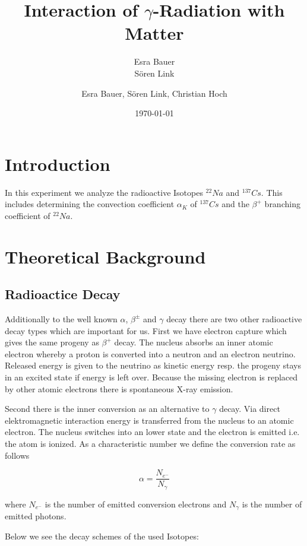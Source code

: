 \documentclass[bigchapter,colorback,accentcolor=tud4b,linedtoc,11pt]{tudreport}
\title{Interaction of $\gamma$-Radiation with Matter}
\subtitle{Esra Bauer  \\Sören Link}
\author{Esra Bauer, Sören Link, Christian Hoch}
\date{\today}
\begin{document}

\maketitle

\tableofcontents

\chapter{Introduction}
In this experiment we analyze the radioactive Isotopes $^{22}Na$ and
$^{137}Cs$. This includes determining the convection coefficient $\alpha_K$ of
$^{137}Cs$ and the $\beta^+$ branching coefficient of $^{22}Na$.

\chapter{Theoretical Background}
\section{Radioactice Decay}

Additionally to the well known $\alpha$, $\beta^{\pm}$ and $\gamma$ decay there are two other radioactive decay types which are important for us. First we have electron capture which gives the same progeny as $\beta^+$ decay. The nucleus absorbs an inner atomic electron whereby a proton is converted into a neutron and an electron neutrino. Released energy is given to the neutrino as kinetic energy resp. the progeny stays in an excited state if energy is left over. Because the missing electron is replaced by other atomic electrons there is spontaneous X-ray emission.

Second there is the inner conversion as an alternative to $\gamma$ decay. Via direct elektromagnetic interaction energy is transferred from the nucleus to an atomic electron. The nucleus switches into an lower state and the electron is emitted i.e. the atom is ionized. As a characteristic number we define the conversion rate as follows

$$\alpha = \frac{N_{e^-}}{N_{\gamma}}$$

where $N_{e^-}$ is the number of emitted conversion electrons and $N_{\gamma}$ is the number of emitted photons.

Below we see the decay schemes of the used Isotopes:
\end{document}

